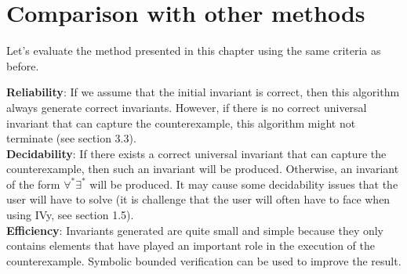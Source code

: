 \documentclass[11pt,a4paper,oldfontcommands,openany]{memoir}
\begin{document}
    \section{Comparison with other methods}

    Let's evaluate the method presented in this chapter using the same criteria as before.

    \textbf{Reliability}: If we assume that the initial invariant is correct, then this algorithm always generate correct invariants.
    However, if there is no correct universal invariant that can capture the counterexample, this algorithm might not terminate (see section 3.3).\\

    \textbf{Decidability}: If there exists a correct universal invariant that can capture the counterexample, then such an invariant will be produced.
    Otherwise, an invariant of the form \(\forall^*\exists^*\) will be produced. It may cause some decidability issues that the user will have to solve
    (it is challenge that the user will often have to face when using IVy, see section 1.5).\\

    \textbf{Efficiency}: Invariants generated are quite small and simple because they only contains elements that have played an important role in the execution of the counterexample.
    Symbolic bounded verification can be used to improve the result.\\
\end{document}
